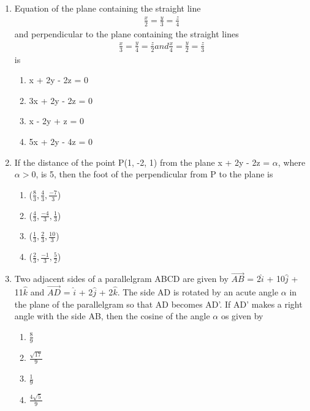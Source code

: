 \begin{enumerate}[label=\arabic*.,ref=\thesubsection.\theenumi]
\item Equation of the plane containing the straight line 
\begin{align*}
\frac{x}{2} = \frac{y}{3} = \frac{z}{4}
\end{align*}
and perpendicular to the plane containing the straight lines 
\begin{align*}
\frac{x}{3} = \frac{y}{4} = \frac{z}{2} and \frac{x}{4} = \frac{y}{2} = \frac{z}{3}
\end{align*}
is
\begin{enumerate}
\item x + 2y - 2z = 0
\item 3x + 2y - 2z = 0
\item x - 2y + z = 0
\item 5x + 2y - 4z = 0
\end{enumerate}

\item If the distance of the point P(1, -2, 1) from the plane x + 2y - 2z = $\alpha$, where $\alpha > 0$, is 5, then the foot of the perpendicular from P to the plane is
\begin{enumerate}
\item ($\frac{8}{3}, \frac{4}{3}, \frac{-7}{3}$)
\item ($\frac{4}{3}, \frac{-4}{3}, \frac{1}{3}$)
\item ($\frac{1}{3}, \frac{2}{3}, \frac{10}{3}$)
\item ($\frac{2}{3}, \frac{-1}{3}, \frac{5}{2}$)
\end{enumerate}

\item Two adjacent sides of a parallelgram ABCD are given by $\overrightarrow{AB}$ = 2$\hat{i}$ + 10$\hat{j}$ + 11$\hat{k}$ and $\overrightarrow{AD}$ = $\hat{i}$ + 2$\hat{j}$ + 2$\hat{k}$. The side AD is rotated by an acute angle $\alpha$ in the plane of the parallelgram so that AD becomes AD'. If AD' makes a right angle with the side AB, then the cosine of the angle $\alpha$ os given by
\begin{enumerate}
\item $\frac{8}{9}$
\item $\frac{\sqrt{17}}{9}$
\item $\frac{1}{9}$
\item $\frac{4\sqrt{5}}{9}$
\end{enumerate}


\end{enumerate}
